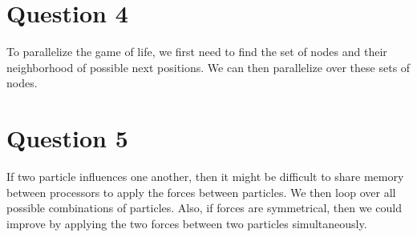 \documentclass[11pt]{article}
\begin{document}
    \section*{Question 4}
        To parallelize the game of life, we first need to find the set of nodes and their neighborhood of possible next positions. We can then parallelize over these sets of nodes.

    \section*{Question 5}
        If two particle influences one another, then it might be difficult to share memory between processors to apply the forces between particles. We then loop over all possible combinations of particles. Also, if forces are symmetrical, then we could improve by applying the two forces between two particles simultaneously.
\end{document}
